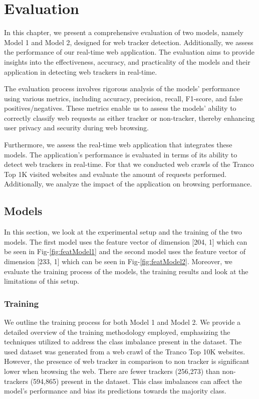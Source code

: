 \chapter{Evaluation}
\label{cha:evaluation}
In this chapter, we present a comprehensive evaluation of two models, namely Model 1 and Model 2, designed for web tracker detection.
Additionally, we assess the performance of our real-time web application. The evaluation aims to provide insights into the effectiveness,
accuracy, and practicality of the models and their application in detecting web trackers in real-time.

The evaluation process involves rigorous analysis of the models' performance using various metrics, including accuracy, precision,
recall, F1-score, and false positives/negatives. These metrics enable us to assess the models' ability to correctly classify web
requests as either tracker or non-tracker, thereby enhancing user privacy and security during web browsing.

Furthermore, we assess the real-time web application that integrates these models. The application's performance is evaluated in
terms of its ability to detect web trackers in real-time. For that we conducted web crawls of the Tranco Top 1K visited websites
and evaluate the amount of requests performed. Additionally, we analyze the impact of the application on browsing performance.
\section{Models}
In this section, we look at the experimental setup and the training of the two models. The first model uses the feature vector of dimension [204, 1] 
which can be seen in Fig-\ref{fig:featModel1} and the second model uses the feature vector of dimension [233, 1]
which can be seen in Fig-\ref{fig:featModel2}. Moreover, we evaluate the training process of the models, the training results and look
at the limitations of this setup.

\subsection{Training}
We outline the training process for both Model 1 and Model 2.
We provide a detailed overview of the training methodology employed, emphasizing the techniques utilized to address
the class imbalance present in the dataset. The used dataset was generated from a web crawl of the Tranco Top 10K websites. 
However, the presence of web tracker in comparison to non tracker is significant lower when browsing the web. There are fewer trackers (256,273) than non-trackers (594,865) present in the dataset. This class imbalances can affect the
model's performance and bias its predictions towards the majority class.

